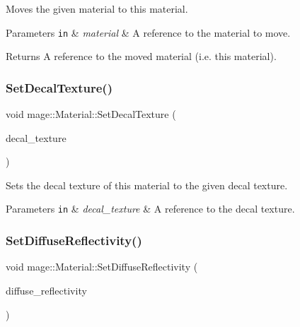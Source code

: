 Moves the given material to this material.


\begin{DoxyParams}[1]{Parameters}
\mbox{\tt in}  & {\em material} & A reference to the material to move. \\
\hline
\end{DoxyParams}
\begin{DoxyReturn}{Returns}
A reference to the moved material (i.\+e. this material). 
\end{DoxyReturn}
\hypertarget{structmage_1_1_material_ad52bf9c9d802fce7f7ec47f35a44d180}{}\label{structmage_1_1_material_ad52bf9c9d802fce7f7ec47f35a44d180} 
\subsubsection{\texorpdfstring{Set\+Decal\+Texture()}{SetDecalTexture()}}
{\footnotesize\ttfamily void mage\+::\+Material\+::\+Set\+Decal\+Texture (\begin{DoxyParamCaption}\item[{\hyperlink{namespacemage_a1e01ae66713838a7a67d30e44c67703e}{Shared\+Ptr}$<$ \hyperlink{classmage_1_1_texture}{Texture} $>$}]{decal\+\_\+texture }\end{DoxyParamCaption})}

Sets the decal texture of this material to the given decal texture.


\begin{DoxyParams}[1]{Parameters}
\mbox{\tt in}  & {\em decal\+\_\+texture} & A reference to the decal texture. \\
\hline
\end{DoxyParams}
\hypertarget{structmage_1_1_material_aef82ef4eba08eabc31989144316a57c6}{}\label{structmage_1_1_material_aef82ef4eba08eabc31989144316a57c6} 
\subsubsection{\texorpdfstring{Set\+Diffuse\+Reflectivity()}{SetDiffuseReflectivity()}\hspace{0.1cm}{\footnotesize\ttfamily [1/2]}}
{\footnotesize\ttfamily void mage\+::\+Material\+::\+Set\+Diffuse\+Reflectivity (\begin{DoxyParamCaption}\item[{const \hyperlink{structmage_1_1_r_g_b_spectrum}{R\+G\+B\+Spectrum} \&}]{diffuse\+\_\+reflectivity }\end{DoxyParamCaption})\hspace{0.3cm}{\ttfamily [noexcept]}}

